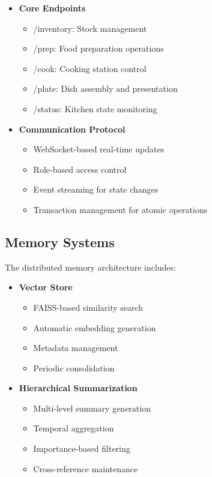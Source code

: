 \documentclass{article}
\begin{document}
\begin{itemize}
    \item \textbf{Core Endpoints}
    \begin{itemize}
        \item /inventory: Stock management
        \item /prep: Food preparation operations
        \item /cook: Cooking station control
        \item /plate: Dish assembly and presentation
        \item /status: Kitchen state monitoring
    \end{itemize}
    
    \item \textbf{Communication Protocol}
    \begin{itemize}
        \item WebSocket-based real-time updates
        \item Role-based access control
        \item Event streaming for state changes
        \item Transaction management for atomic operations
    \end{itemize}
\end{itemize}

\subsection{Memory Systems}
The distributed memory architecture includes:

\begin{itemize}
    \item \textbf{Vector Store}
    \begin{itemize}
        \item FAISS-based similarity search
        \item Automatic embedding generation
        \item Metadata management
        \item Periodic consolidation
    \end{itemize}
    
    \item \textbf{Hierarchical Summarization}
    \begin{itemize}
        \item Multi-level summary generation
        \item Temporal aggregation
        \item Importance-based filtering
        \item Cross-reference maintenance
    \end{itemize}
\end{itemize}
\end{document}

